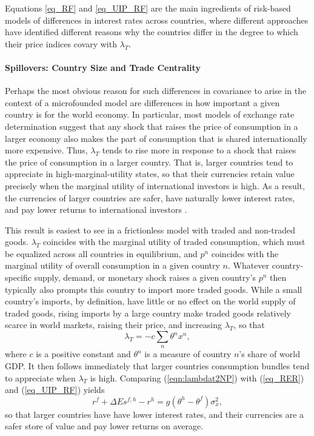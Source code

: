 \documentclass{ar-1col}
\begin{document}
Equations \eqref{eq_RF} and \eqref{eq_UIP_RF} are the main ingredients of risk-based models of differences in interest rates across countries, where different approaches have identified different reasons why the countries differ in the degree to which their price indices covary with $\lambda_T$.

\paragraph*{Spillovers: Country Size and Trade Centrality}

Perhaps the most obvious reason for such differences in covariance to arise in the context of a microfounded model are differences in how important a given country is for the world economy. In particular, most models of exchange rate determination suggest that any shock that raises the price of consumption in a larger economy also makes the part of consumption that is shared internationally more expensive. Thus, $\lambda_T$ tends to rise more in response to a shock that raises the price of consumption in a larger country. That is, larger countries tend to appreciate in high-marginal-utility states, so that their currencies retain value precisely when the marginal utility of international investors is high. As a result, the currencies of larger countries are safer, have naturally lower interest rates, and pay lower returns to international investors \citep{Martin2012, Hassan2013}.

This result is easiest to see in a frictionless model with traded and non-traded goods. $\lambda_T$ coincides with the marginal utility of traded consumption, which must be equalized across all countries in equilibrium, and $p^n$ coincides with the marginal utility of overall consumption in a given country $n$. Whatever country-specific supply, demand, or monetary shock raises a given country's $p^n$ then typically also prompts this country to import more traded goods. While a small country's imports, by definition, have little or no effect on the world supply of traded goods, rising imports by a large country make traded goods relatively scarce in world markets, raising their price, and increasing $\lambda_T$, so that
\begin{equation} \lambda_{T} = -c \sum_{n} \theta^n x^n,
    \label{eqn:lambdat2NP}
\end{equation}
where $c$ is a positive constant and $\theta^n$ is a measure of country $n$'s share of world GDP. It then follows immediately that larger countries consumption bundles tend to appreciate when $\lambda_T$ is high. Comparing (\ref{eqn:lambdat2NP}) with (\ref{eq_RER}) and (\ref{eq_UIP_RF}) yields
\begin{equation}
  r^{f} + \Delta E s^{f, h} - r^{h}
  =g\left(\theta^h - \theta^f\right) \sigma_x^2,
  \label{eq_FF_UIP}
\end{equation}
so that larger countries have have lower interest rates, and their currencies are a safer store of value and pay lower returns on average.
  
\end{document}
